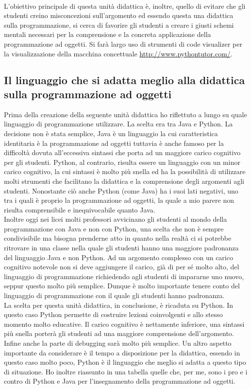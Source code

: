 \documentclass[12pt,a4paper]{article}
\begin{document}
\\L'obiettivo principale di questa unità didattica è, inoltre, quello di evitare che gli studenti creino misconcezioni sull’argomento ed essendo questa una didattica sulla programmazione, si cerca di favorire gli studenti a creare i giusti schemi mentali necessari per la comprensione e la concreta applicazione della programmazione ad oggetti. Si farà largo uso di strumenti di code visualizer per la visualizzazione della macchina concettuale \url{http://www.pythontutor.com/}.










\subsection{Il linguaggio che si adatta meglio alla didattica sulla programmazione ad oggetti}\label{scelta-linguaggio}
Prima della creazione della seguente unità didattica ho riflettuto a lungo su quale linguaggio di programmazione utilizzare. La scelta era tra Java e Python. La decisione non è stata semplice, Java è un linguaggio la cui caratteristica identitaria è la programmazione ad oggetti tuttavia è anche famoso per la difficoltà dovuta all’eccessiva sintassi che porta ad un maggiore carico cognitivo per gli studenti. Python, al contrario, risulta essere un linguaggio con un minor carico cognitivo, la cui sintassi è molto più snella ed ha la possibilità di utilizzare molti strumenti che facilitano la didattica e la comprensione degli argomenti agli studenti. Nonostante ciò anche Python (come Java) ha i suoi lati negativi, uno tra i quali è proprio la programmazione ad oggetti, la quale a mio parere non risulta comprensibile e inequivocabile quanto Java.\\Inoltre oggi nei licei molti professori avvicinano gli studenti al mondo della programmazione con Java e non con Python, una scelta che non è sempre condivisibile ma bisogna prenderne atto in quanto nella realtà ci si potrebbe ritrovare in una classe nella quale gli studenti hanno una maggiore padronanza del linguaggio Java e non Python. Ad un argomento complesso con un carico cognitivo notevole non si deve aggiungere il carico, già di per sé molto alto, del linguaggio di programmazione richiedendo agli studenti di impararne uno nuovo, seppur questo molto più semplice. Dunque è molto importante tenere conto del linguaggio di programmazione con il quale gli studenti hanno padronanza.\\La scelta per questa unità didattica, in conclusione, è ricaduta su Python. In questo caso Python permette di costruire lezioni coinvolgenti e allo stesso momento molto educative. Il carico cognitivo è nettamente inferiore, una sintassi più snella porterà gli studenti ad una maggiore comprensione dell’argomento. Infine anche la parte di debugging sarà molto più semplice. Un altro aspetto importante da considerare è il tempo a disposizione per la didattica, essendo in questo caso molto poco, Python è il linguaggio che meglio si adatta a questo tipo di situazione. Ho inoltre riassunto in una tabella quelle che, per me, sono i pro e i contro di Python e Java per l’insegnamento della programmazione ad oggetti. 
\end{document}
